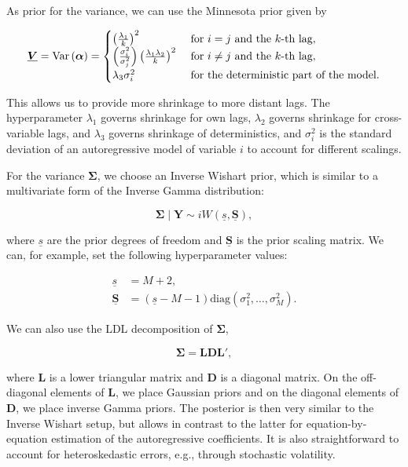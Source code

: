 As prior for the variance, we can use the Minnesota prior given by

\begin{equation}
	\underline{\bm{V}} = \mathrm{Var}\left({\bm{\alpha}}\right) =
	\begin{cases}
		\left(\frac{\lambda_1}{k}\right)^2 & \text{ for $i = j$ and the $k$-th lag}, \\
		\left(\frac{\sigma^2_i}{\sigma^2_j}\right)\left(\frac{\lambda_1\lambda_2}{k}\right)^2 & \text{ for $ i \neq j $ and the $k$-th lag}, \\
		\lambda_3\sigma^2_i & \text{ for the deterministic part of the model}.
	\end{cases}
\end{equation}

This allows us to provide more shrinkage to more distant lags. The hyperparameter $\lambda_1$ governs shrinkage for own lags, $\lambda_2$ governs shrinkage for cross-variable lags, and $\lambda_3$ governs shrinkage of deterministics, and $\sigma^2_i$ is the standard deviation of an autoregressive model of variable $i$ to account for different scalings.

For the variance $\bm{\Sigma}$, we choose an Inverse Wishart prior, which is similar to a multivariate form of the Inverse Gamma distribution:

\begin{equation}
	\bm{\Sigma}\mid\bm{Y}\sim iW(\underline{s},\underline{\bm{S}}),
\end{equation}

where $\underline{s}$ are the prior degrees of freedom and $\underline{\bm{S}}$ is the prior scaling matrix. We can, for example, set the following hyperparameter values:

\begin{align*}
	\underline{s} &= M + 2, \\
	\underline{\bm{S}} &= (\underline{s}-M-1)\mathrm{diag}(\sigma_1^2,\dots,\sigma_M^2).
\end{align*}

We can also use the LDL decomposition of $\bm{\Sigma}$, 

\[
	\bm{\Sigma} = \bm{LDL}',
\]

where $\bm{L}$ is a lower triangular matrix and $\bm{D}$ is a diagonal matrix. On the off-diagonal elements of $\bm{L}$, we place Gaussian priors and on the diagonal elements of $\bm{D}$, we place inverse Gamma priors. The posterior is then very similar to the Inverse Wishart setup, but allows in contrast to the latter for equation-by-equation estimation of the autoregressive coefficients. It is also straightforward to account for heteroskedastic errors, e.g., through stochastic volatility. 

